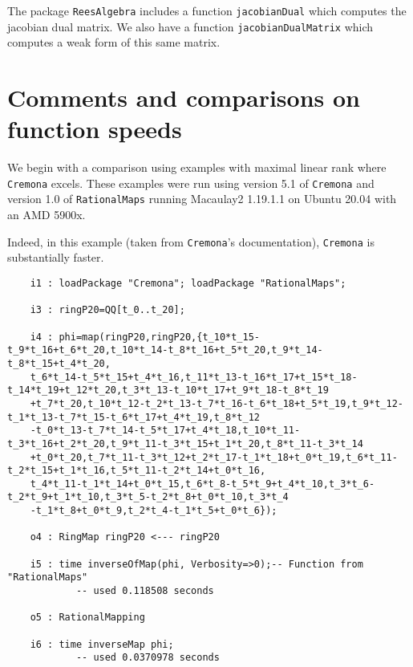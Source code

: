 \documentclass[11pt]{amsart}%
\numberwithin{equation}{theorem}
\renewcommand{\:}{\colon}
\theoremstyle{theorem}
\begin{document}
{{The package {\tt ReesAlgebra} \cite{ReesAlgebraSource, ReesAlgebraArticle} includes a function {\tt jacobianDual} which computes the jacobian dual matrix.  We also have a function {\tt jacobianDualMatrix} which computes a weak form of this same matrix.

\section{Comments and comparisons on function speeds}
\noindent
We begin with a comparison using examples with maximal linear rank where {\tt Cremona} excels.  These examples were run using version 5.1 of {\tt Cremona} and version 1.0 of {\tt RationalMaps} running Macaulay2 1.19.1.1 on Ubuntu 20.04 with an AMD 5900x.

Indeed, in this example (taken from {\tt Cremona}'s documentation), {\tt Cremona} is substantially faster.
{\scriptsize
\color{blue}\begin{verbatim}
    i1 : loadPackage "Cremona"; loadPackage "RationalMaps";

    i3 : ringP20=QQ[t_0..t_20];    

    i4 : phi=map(ringP20,ringP20,{t_10*t_15-t_9*t_16+t_6*t_20,t_10*t_14-t_8*t_16+t_5*t_20,t_9*t_14-t_8*t_15+t_4*t_20,
    t_6*t_14-t_5*t_15+t_4*t_16,t_11*t_13-t_16*t_17+t_15*t_18-t_14*t_19+t_12*t_20,t_3*t_13-t_10*t_17+t_9*t_18-t_8*t_19
    +t_7*t_20,t_10*t_12-t_2*t_13-t_7*t_16-t_6*t_18+t_5*t_19,t_9*t_12-t_1*t_13-t_7*t_15-t_6*t_17+t_4*t_19,t_8*t_12
    -t_0*t_13-t_7*t_14-t_5*t_17+t_4*t_18,t_10*t_11-t_3*t_16+t_2*t_20,t_9*t_11-t_3*t_15+t_1*t_20,t_8*t_11-t_3*t_14
    +t_0*t_20,t_7*t_11-t_3*t_12+t_2*t_17-t_1*t_18+t_0*t_19,t_6*t_11-t_2*t_15+t_1*t_16,t_5*t_11-t_2*t_14+t_0*t_16,
    t_4*t_11-t_1*t_14+t_0*t_15,t_6*t_8-t_5*t_9+t_4*t_10,t_3*t_6-t_2*t_9+t_1*t_10,t_3*t_5-t_2*t_8+t_0*t_10,t_3*t_4
    -t_1*t_8+t_0*t_9,t_2*t_4-t_1*t_5+t_0*t_6});

    o4 : RingMap ringP20 <--- ringP20                                                                     

    i5 : time inverseOfMap(phi, Verbosity=>0);-- Function from "RationalMaps"                              
            -- used 0.118508 seconds                                                                             
    
    o5 : RationalMapping

    i6 : time inverseMap phi;
            -- used 0.0370978 seconds                                                                            
    

\end{verbatim}}}}
\end{document}
